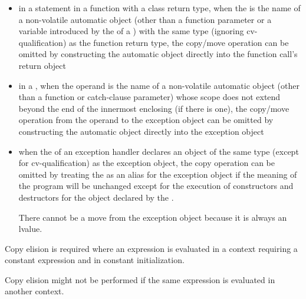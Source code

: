 \begin{itemize}
\item in a  statement in a function with a class return type,
when the  is the name of a non-volatile
automatic object (other than a function parameter or a variable
introduced by the  of a
)
with the same type (ignoring cv-qualification) as
the function return type, the copy/move operation can be
omitted by constructing the automatic object directly
into the function call's return object

\item in a , when the operand
is the name of a non-volatile automatic object
(other than a function or catch-clause parameter)
whose scope does not extend beyond the end of the innermost enclosing
 (if there is one), the copy/move operation from the
operand to the exception object can be omitted by
constructing the automatic object directly into the exception object

\item when the  of an
exception handler declares an object of the same
type (except for cv-qualification) as the exception
object, the copy operation can be omitted by treating
the  as an alias for the exception
object if the meaning of the program will be unchanged except for the execution
of constructors and destructors for the object declared by the
.
\begin{note} There cannot be a move from the exception object because it is
always an lvalue.  \end{note}
\end{itemize}
Copy elision is required
where an expression is evaluated in a context
requiring a constant expression
and in constant initialization.
\begin{note}
Copy elision might not be performed
if the same expression
is evaluated in another context.
\end{note}

